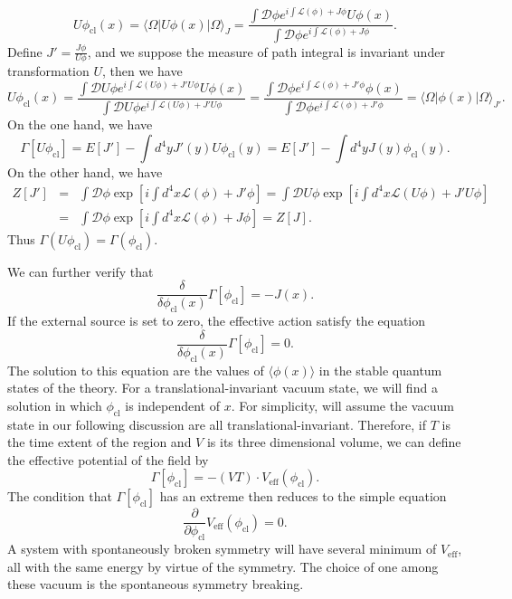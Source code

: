 \begin{newproof}
\[ U\phi_{\mathrm{cl}}(x) = \langle \Omega | U\phi(x) | \Omega\rangle_{J} = \frac{\int \mathcal{D}\phi e^{i \int \mathcal{L}(\phi)+J\phi}U\phi(x)}{\int \mathcal{D}\phi e^{i \int \mathcal{L}(\phi)+J\phi}}.\]
Define $J' = \frac{J\phi}{U\phi}$,  and we suppose the measure of path integral is invariant under transformation $U$, then we have
\[ U\phi_{\mathrm{cl}}(x) = \frac{\int \mathcal{D}U\phi e^{i \int \mathcal{L}(U\phi)+J'U\phi}U\phi(x)}{\int \mathcal{D}U\phi e^{i \int \mathcal{L}(U\phi)+J'U\phi}} =  \frac{\int \mathcal{D}\phi e^{i \int \mathcal{L}(\phi)+J'\phi}\phi(x)}{\int \mathcal{D}\phi e^{i \int \mathcal{L}(\phi)+J'\phi}} = \langle \Omega | \phi(x) | \Omega\rangle_{J'}.\]
On the one hand, we have
\[\Gamma[U\phi_{\mathrm{cl}}] = E[J'] - \int d^4y J'(y)U\phi_{\mathrm{cl}}(y) =  E[J'] - \int d^4y J(y)\phi_{\mathrm{cl}}(y).\]
On the other hand, we have
\begin{eqnarray}
Z[J'] &=& \int \mathcal{D}\phi \exp \left[ i \int d^4x \mathcal{L}(\phi)+J'\phi \right] =  \int \mathcal{D}U\phi \exp \left[ i \int d^4x \mathcal{L}(U\phi)+J'U\phi \right] \nonumber
\\
&=& \int \mathcal{D}\phi \exp \left[ i \int d^4x \mathcal{L}(\phi)+J\phi \right] = Z[J] .\nonumber
\end{eqnarray}
Thus $\Gamma(U\phi_{\mathrm{cl}}) = \Gamma(\phi_{\mathrm{cl}})$.
\end{newproof}

\noindent
We can further verify that
\[\frac{\delta}{\delta \phi_{\mathrm{cl}}(x)} \Gamma[\phi_{\mathrm{cl}}] = -J(x).\]
If the external source is set to zero, the effective action satisfy the equation
\[\frac{\delta}{\delta \phi_{\mathrm{cl}}(x)} \Gamma[\phi_{\mathrm{cl}}] = 0.\]
The solution to this equation are the values of $\langle \phi(x) \rangle$ in the stable quantum states of the theory. For a translational-invariant vacuum state, we will find a solution in which $\phi_{\mathrm{cl}}$ is independent of $x$. For simplicity, will assume the vacuum state in our following discussion are all translational-invariant. 
Therefore, if $T$ is the time extent of the region and $V$ is its three dimensional volume, we can define the effective potential of the field by
\[\Gamma[\phi_{\mathrm{cl}}] = -(VT) \cdot V_{\mathrm{eff}}(\phi_{\mathrm{cl}}).\]
The condition that $\Gamma[\phi_{\mathrm{cl}}]$ has an extreme then reduces to the simple equation
\[\frac{\partial}{\partial \phi_{\mathrm{cl}}} V_{\mathrm{eff}}(\phi_{\mathrm{cl}}) = 0.\] 
A system with spontaneously broken symmetry will have several minimum of $V_{\mathrm{eff}}$, all with the same energy by virtue of the symmetry. The choice of one among these vacuum is the spontaneous symmetry breaking.

